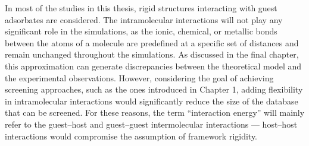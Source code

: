 \documentclass[main.tex]{subfiles}
\begin{document}
In most of the studies in this thesis, rigid structures interacting with guest adsorbates are considered. The intramolecular interactions will not play any significant role in the simulations, as the ionic, chemical, or metallic bonds between the atoms of a molecule are predefined at a specific set of distances and remain unchanged throughout the simulations. As discussed in the final chapter, this approximation can generate discrepancies between the theoretical model and the experimental observations. However, considering the goal of achieving screening approaches, such as the ones introduced in Chapter 1, adding flexibility in intramolecular interactions would significantly reduce the size of the database that can be screened. For these reasons, the term ``interaction energy'' will mainly refer to the guest--host and guest--guest intermolecular interactions --- host--host interactions would compromise the assumption of framework rigidity.
\end{document}
